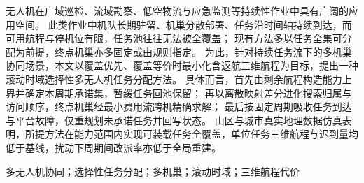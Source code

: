 
\vspace{1em}

%
无人机在广域巡检、流域勘察、低空物流与应急监测等持续性作业中具有广阔的应用空间。
此类作业中机队长期驻留、机巢分散部署、任务沿时间轴持续到达，而可用航程与停机位有限，任务池往往无法被全覆盖；
现有方法多以任务全集可分配为前提，终点机巢亦多固定或由规则指定。
为此，针对持续任务流下的多机巢协同场景，本文以覆盖优先、覆盖等价时最小化含返航三维航程为目标，提出一种滚动时域选择性多无人机任务分配方法。
具体而言，首先由剩余航程构造能力上界并确定本周期承诺集，暂缓任务回池保留；
再以离散映射差分进化搜索归属与访问顺序，终点机巢经最小费用流跨机精确求解；
最后按固定周期吸收任务到达与平台故障，仅重规划未承诺任务并回写状态。
山区与城市真实地理数据仿真表明，所提方法在能力范围内实现可装载任务全覆盖，单位任务三维航程与迟到量均低于基线，扰动下周期间改派率亦低于全局重建。

\par\vspace{0.8em}

%
多无人机协同；选择性任务分配；多机巢；滚动时域；三维航程代价

\vspace{1.2em}
